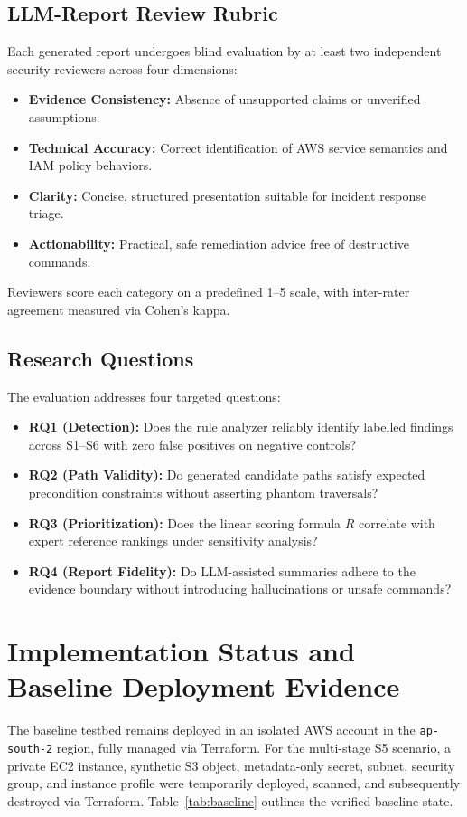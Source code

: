 \documentclass[conference]{IEEEtran}
\begin{document}
\subsection{LLM-Report Review Rubric}
Each generated report undergoes blind evaluation by at least two independent security reviewers across four dimensions:
\begin{itemize}
\item \textbf{Evidence Consistency:} Absence of unsupported claims or unverified assumptions.
\item \textbf{Technical Accuracy:} Correct identification of AWS service semantics and IAM policy behaviors.
\item \textbf{Clarity:} Concise, structured presentation suitable for incident response triage.
\item \textbf{Actionability:} Practical, safe remediation advice free of destructive commands.
\end{itemize}
Reviewers score each category on a predefined 1--5 scale, with inter-rater agreement measured via Cohen's kappa.

\subsection{Research Questions}
The evaluation addresses four targeted questions:
\begin{itemize}
\item \textbf{RQ1 (Detection):} Does the rule analyzer reliably identify labelled findings across S1--S6 with zero false positives on negative controls?
\item \textbf{RQ2 (Path Validity):} Do generated candidate paths satisfy expected precondition constraints without asserting phantom traversals?
\item \textbf{RQ3 (Prioritization):} Does the linear scoring formula $R$ correlate with expert reference rankings under sensitivity analysis?
\item \textbf{RQ4 (Report Fidelity):} Do LLM-assisted summaries adhere to the evidence boundary without introducing hallucinations or unsafe commands?
\end{itemize}

\section{Implementation Status and Baseline Deployment Evidence}
The baseline testbed remains deployed in an isolated AWS account in the \texttt{ap-south-2} region, fully managed via Terraform. For the multi-stage S5 scenario, a private EC2 instance, synthetic S3 object, metadata-only secret, subnet, security group, and instance profile were temporarily deployed, scanned, and subsequently destroyed via Terraform. Table~\ref{tab:baseline} outlines the verified baseline state.
\end{document}
